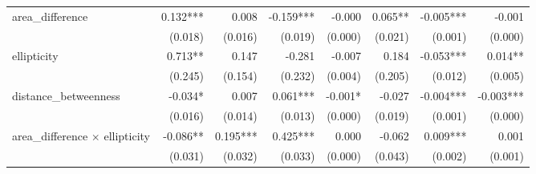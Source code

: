 \begin{tabular}{lrrrrrrr}
area\_difference                           &                     0.132*** &                      0.008 &                    -0.159*** &                           -0.000 &                        0.065** &                                                         -0.005*** &                                              -0.001 \\ 
                                           &                      (0.018) &                    (0.016) &                      (0.019) &                          (0.000) &                        (0.021) &                                                           (0.001) &                                             (0.000) \\ 
ellipticity                                &                      0.713** &                      0.147 &                       -0.281 &                           -0.007 &                          0.184 &                                                         -0.053*** &                                             0.014** \\ 
                                           &                      (0.245) &                    (0.154) &                      (0.232) &                          (0.004) &                        (0.205) &                                                           (0.012) &                                             (0.005) \\ 
distance\_betweenness                      &                      -0.034* &                      0.007 &                     0.061*** &                          -0.001* &                         -0.027 &                                                         -0.004*** &                                           -0.003*** \\ 
                                           &                      (0.016) &                    (0.014) &                      (0.013) &                          (0.000) &                        (0.019) &                                                           (0.001) &                                             (0.000) \\ 
area\_difference $\times$ ellipticity      &                     -0.086** &                   0.195*** &                     0.425*** &                            0.000 &                         -0.062 &                                                          0.009*** &                                               0.001 \\ 
                                           &                      (0.031) &                    (0.032) &                      (0.033) &                          (0.000) &                        (0.043) &                                                           (0.002) &                                             (0.001) \\ 

\end{tabular}
